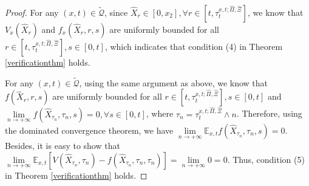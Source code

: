 \documentclass[11pt,reqno]{article}%
\numberwithin{equation}{section}
\begin{document}
\begin{proof}
For any $(x,t)\in \mathcal{\tilde{Q}}$, since $\hat{X}_r\in[0,x_2], \forall r\in[t,\tau^{x,t;\hat\Pi,\hat\Xi}_{t}]$, we know that $V_x(\hat{X}_r)$ and  $f_x(\hat{X}_r,r,s)$ are uniformly bounded for all $r\in[t,\tau^{x,t;\hat\Pi,\hat\Xi}_{t}], s\in[0,t]$, which indicates that condition (4) in Theorem \ref{verificationthm} holds.
 
 For any $(x,t)\in \mathcal{\tilde{Q}}$, using the same argument as above, we know that $f(\hat{X}_r,r,s)$ are uniformly bounded for all $r\in[t,\tau^{x,t;\hat\Pi,\hat\Xi}_{t}], s\in[0,t]$ and $\lim\limits_{n\rightarrow +\infty}f(\hat{X}_{\tau_n},\tau_n,s)=0, \forall  s\in[0,t]$, where $\tau_n=\tau^{x,t;\hat\Pi,\hat\Xi}_{t}\wedge n$. Therefore, using the dominated convergence theorem, we have $\lim\limits_{n\rightarrow+\infty}\mathbb{E}_{x,t}f\left(\hat{X}_{\tau_{n}},\tau_{n},s\right)=0$. Besides, it is easy to show that $\lim\limits_{n\rightarrow+\infty}\mathbb{E}_{x,t}\left[V\left(\hat{X}_{\tau_{n}},\tau_{n}\right)-f\left(\hat{X}_{\tau_{n}},\tau_{n},\tau_{n}\right)\right]=\lim\limits_{n\rightarrow+\infty}0=0$. Thus, condition (5) in Theorem \ref{verificationthm} holds.


\end{proof}
\end{document}
